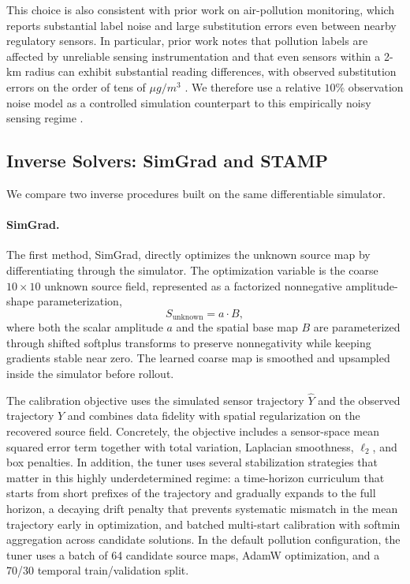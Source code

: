 This choice is also consistent with prior work on air-pollution monitoring, which reports substantial label noise and large substitution errors even between nearby regulatory sensors. In particular, prior work notes that pollution labels are affected by unreliable sensing instrumentation and that even sensors within a 2-km radius can exhibit substantial reading differences, with observed substitution errors on the order of tens of $\mu g/m^3$ \citep{bhardwaj2022learning}. We therefore use a relative $10\%$ observation noise model as a controlled simulation counterpart to this empirically noisy sensing regime \citep{bhardwaj2022learning}.

\subsection{Inverse Solvers: SimGrad and STAMP}
\label{subsec:inverse_solvers}

We compare two inverse procedures built on the same differentiable simulator.

\paragraph{SimGrad.}
The first method, SimGrad, directly optimizes the unknown source map by differentiating through the simulator. The optimization variable is the coarse $10\times 10$ unknown source field, represented as a factorized nonnegative amplitude-shape parameterization,
\begin{equation}
S_{\mathrm{unknown}} = a \cdot B, \nonumber
\end{equation}
where both the scalar amplitude $a$ and the spatial base map $B$ are parameterized through shifted softplus transforms to preserve nonnegativity while keeping gradients stable near zero. The learned coarse map is smoothed and upsampled inside the simulator before rollout.

The calibration objective uses the simulated sensor trajectory $\widehat{Y}$ and the observed trajectory $Y$ and combines data fidelity with spatial regularization on the recovered source field. Concretely, the objective includes a sensor-space mean squared error term together with total variation, Laplacian smoothness, $\ell_2$, and box penalties. In addition, the tuner uses several stabilization strategies that matter in this highly underdetermined regime: a time-horizon curriculum that starts from short prefixes of the trajectory and gradually expands to the full horizon, a decaying drift penalty that prevents systematic mismatch in the mean trajectory early in optimization, and batched multi-start calibration with softmin aggregation across candidate solutions. In the default pollution configuration, the tuner uses a batch of 64 candidate source maps, AdamW optimization, and a 70/30 temporal train/validation split.

